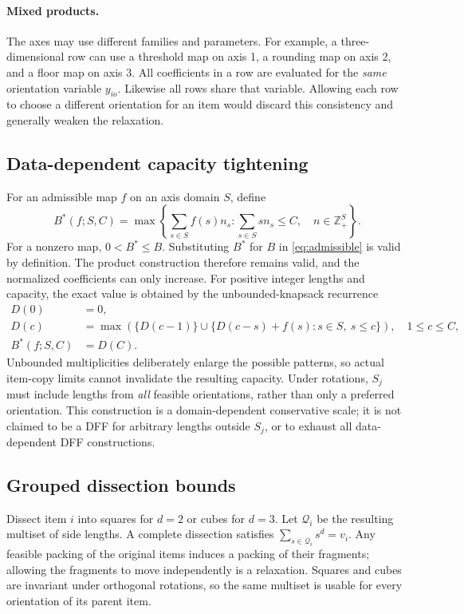\paragraph{Mixed products.}
The axes may use different families and parameters. For example, a
three-dimensional row can use a threshold map on axis 1, a rounding
map on axis 2, and a floor map on axis 3. All coefficients in a row
are evaluated for the \emph{same} orientation variable $y_{io}$.
Likewise all rows share that variable. Allowing each row to choose a
different orientation for an item would discard this consistency
and generally weaken the relaxation.

\subsection{Data-dependent capacity tightening}
For an admissible map $f$ on an axis domain $S$, define
\begin{equation}
 B^*(f;S,C)=\max\left\{\sum_{s\in S}f(s)n_s:
        \sum_{s\in S}s n_s\leq C,\quad n\in\mathbb Z_+^S\right\}.
                                                               \label{eq:tight-capacity}
\end{equation}
For a nonzero map, $0<B^*\leq B$. Substituting $B^*$ for $B$ in
\eqref{eq:admissible} is valid by definition. The product construction
therefore remains valid, and the normalized coefficients can only
increase. For positive integer lengths and capacity, the exact value
is obtained by the unbounded-knapsack recurrence
\begin{align}
 D(0)&=0,\nonumber\\
 D(c)&=\max\left(\{D(c-1)\}\cup
          \{D(c-s)+f(s):s\in S,\ s\leq c\}\right),\quad 1\leq c\leq C,
                                                               \label{eq:dp}\\
 B^*(f;S,C)&=D(C).\nonumber
\end{align}
Unbounded multiplicities deliberately enlarge the possible patterns,
so actual item-copy limits cannot invalidate the resulting capacity.
Under rotations, $S_j$ must include lengths from \emph{all} feasible
orientations, rather than only a preferred orientation. This
construction is a domain-dependent conservative scale; it is not
claimed to be a DFF for arbitrary lengths outside $S_j$, or to exhaust
all data-dependent DFF constructions.

\subsection{Grouped dissection bounds}
\label{subsec:fragments}
Dissect item $i$ into squares for $d=2$ or cubes for $d=3$. Let
$\mathcal Q_i$ be the resulting multiset of side lengths. A complete
dissection satisfies $\sum_{s\in\mathcal Q_i}s^d=v_i$. Any feasible
packing of the original items induces a packing of their fragments;
allowing the fragments to move independently is a relaxation.
Squares and cubes are invariant under orthogonal rotations, so the
same multiset is usable for every orientation of its parent item.

